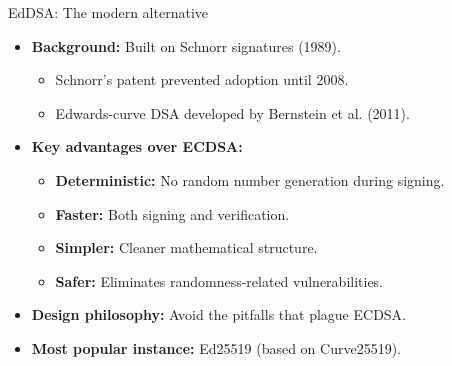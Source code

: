 \documentclass[aspectratio=169, lualatex, handout]{beamer}
\begin{document}
\begin{frame}{EdDSA: The modern alternative}
	\begin{itemize}[<+->]
		\item \textbf{Background:} Built on Schnorr signatures (1989).
		      \begin{itemize}
			      \item Schnorr's patent prevented adoption until 2008.
			      \item Edwards-curve DSA developed by Bernstein et al. (2011).
		      \end{itemize}
		\item \textbf{Key advantages over ECDSA:}
		      \begin{itemize}
			      \item \textbf{Deterministic:} No random number generation during signing.
			      \item \textbf{Faster:} Both signing and verification.
			      \item \textbf{Simpler:} Cleaner mathematical structure.
			      \item \textbf{Safer:} Eliminates randomness-related vulnerabilities.
		      \end{itemize}
		\item \textbf{Design philosophy:} Avoid the pitfalls that plague ECDSA.
		\item \textbf{Most popular instance:} Ed25519 (based on Curve25519).
	\end{itemize}
\end{frame}
\end{document}
